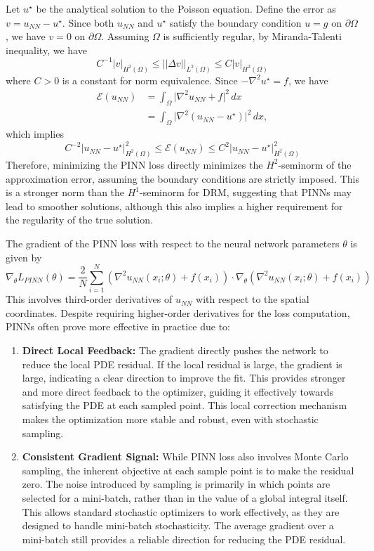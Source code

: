 \documentclass{article}
\begin{document}
Let $u^\star$ be the analytical solution to the Poisson equation. 
Define the error as $v = u_{NN} - u^\star$. Since both $u_{NN}$ and $u^\star$ satisfy the boundary condition $u=g$ on $\partial\Omega$, we have $v=0$ on $\partial\Omega$.
Assuming $\Omega$ is sufficiently regular, 
by Miranda-Talenti inequality, 
we have $$ C^{-1} \vert v \vert_{H^2(\Omega)} \leq ||\Delta v||_{L^2(\Omega)} \leq C \vert v \vert_{H^2(\Omega)} $$
where $C > 0$ is a constant for norm equivalence.
Since $-\nabla^2 u^\star = f$, we have 
\begin{align*}
\mathcal{E}(u_{NN}) &= \int_{\Omega} \vert \nabla^2 u_{NN} + f \vert^2 \, dx \\
& = \int_{\Omega} \vert \nabla^2 (u_{NN} - u^\star) \vert^2 \, dx,
\end{align*}
which implies 
$$ C^{-2} \vert u_{NN} - u^\star \vert_{H^2(\Omega)}^2 \leq \mathcal{E}(u_{NN}) \leq C^2 \vert u_{NN} - u^\star \vert_{H^2(\Omega)}^2 $$
Therefore, minimizing the PINN loss directly minimizes the $H^2$-seminorm of the approximation error, assuming the boundary conditions are strictly imposed. This is a stronger norm than the $H^1$-seminorm for DRM, suggesting that PINNs may lead to smoother solutions, although this also implies a higher requirement for the regularity of the true solution.

The gradient of the PINN loss with respect to the neural network parameters $\theta$ is given by
\begin{equation}
    \nabla_{\theta} L_{PINN}(\theta) = \frac{2}{N} \sum_{i=1}^N 
 (\nabla^2 u_{NN}(x_i; \theta) + f(x_i)) \cdot \nabla_{\theta} (\nabla^2 u_{NN}(x_i; \theta) + f(x_i))
\end{equation}
This involves third-order derivatives of $u_{NN}$ with respect to the spatial coordinates.
Despite requiring higher-order derivatives for the loss computation, PINNs often prove more effective in practice due to:
\begin{enumerate}
\item  \textbf{Direct Local Feedback:} The gradient directly pushes the network to reduce the local PDE residual. If the local residual is large, the gradient is large, indicating a clear direction to improve the fit. This provides stronger and more direct feedback to the optimizer, guiding it effectively towards satisfying the PDE at each sampled point. This local correction mechanism makes the optimization more stable and robust, even with stochastic sampling.
\item  \textbf{Consistent Gradient Signal:} While PINN loss also involves Monte Carlo sampling, the inherent objective at each sample point is to make the residual zero. The noise introduced by sampling is primarily in which points are selected for a mini-batch, rather than in the value of a global integral itself. This allows standard stochastic optimizers to work effectively, as they are designed to handle mini-batch stochasticity. The average gradient over a mini-batch still provides a reliable direction for reducing the PDE residual.
\end{enumerate}
\end{document}
